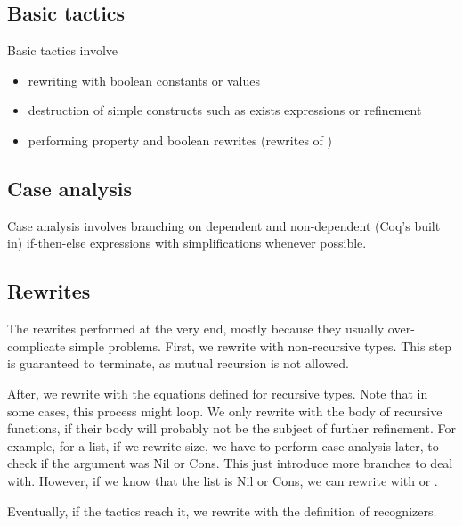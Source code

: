 \subsection{Basic tactics}

Basic tactics involve
\begin{itemize}
	\item rewriting with boolean constants or values
	\item destruction of simple constructs such as exists expressions or refinement
	\item performing property and boolean rewrites (rewrites of )
\end{itemize}

\subsection{Case analysis}

Case analysis involves branching on dependent and non-dependent (Coq's built in) if-then-else expressions with simplifications whenever possible.

\subsection{Rewrites}

The rewrites performed at the very end, mostly because they usually over-complicate simple problems. First, we rewrite with non-recursive types. This step is guaranteed to terminate, as mutual recursion is not allowed.

After, we rewrite with the equations defined for recursive types. Note that in some cases, this process might loop. We only rewrite with the body of recursive functions, if their body will probably not be the subject of further refinement. For example, for a list, if we rewrite size, we have to perform case analysis later, to check if the argument was Nil or Cons. This just introduce more branches to deal with. However, if we know that the list is Nil or Cons, we can rewrite with  or .

Eventually, if the tactics reach it, we rewrite with the definition of recognizers.